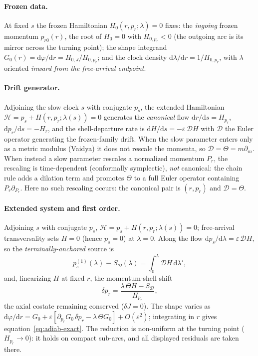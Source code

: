 \documentclass[12pt]{iopart}
\newcommand{\dd}{\mathrm{d}}
\theoremstyle{plain}
\theoremstyle{definition}
\theoremstyle{plain}
\theoremstyle{remark}
\begin{document}
\paragraph{Frozen data.} At fixed $s$ the frozen Hamiltonian $H_0(r,p_r;\lambda)=0$
fixes: the \emph{ingoing} frozen momentum $p_{r0}(r)$, the root of $H_0=0$ with
$H_{0,p_r}<0$ (the outgoing arc is its mirror across the turning point); the shape
integrand $G_0(r)=\dd\varphi/\dd r=H_{0,J}/H_{0,p_r}$; and the clock density
$\dd\lambda/\dd r=1/H_{0,p_r}$, with $\lambda$ oriented \emph{inward from the
free-arrival endpoint}.

\paragraph{Drift generator.} Adjoining the slow clock $s$ with conjugate $p_s$, the
extended Hamiltonian $\mathcal H=p_s+H(r,p_r;\lambda(s))=0$ generates the \emph{canonical}
flow $\dd r/\dd s=H_{p_r}$, $\dd p_r/\dd s=-H_r$, and the shell-departure rate is
$\dd H/\dd s=-\varepsilon\,\mathcal D H$ with $\mathcal D$ the Euler operator generating
the frozen-family drift. When the slow parameter enters only as a metric modulus
(Vaidya) it does not rescale the momenta, so $\mathcal D=\Theta=m\partial_m$. When
instead a slow parameter rescales a normalized momentum $P_r$, the rescaling is
time-dependent (conformally symplectic), \emph{not} canonical: the chain rule adds a
dilation term and promotes $\Theta$ to a full Euler operator containing
$P_r\partial_{P_r}$. Here no such rescaling occurs: the canonical pair is $(r,p_r)$ and
$\mathcal D=\Theta$.

\paragraph{Extended system and first order.} Adjoining $s$ with conjugate $p_s$,
$\mathcal H=p_s+H(r,p_r;\lambda(s))=0$; free-arrival transversality sets $H=0$ (hence
$p_s=0$) at $\lambda=0$. Along the flow $\dd p_s/\dd\lambda=\varepsilon\,\mathcal D H$, so
the \emph{terminally-anchored} source is
\begin{equation}
    p_s^{(1)}(\lambda)\equiv S_{\mathcal D}(\lambda)
    =\int_0^{\lambda}\mathcal D H\,\dd\lambda',
    \label{eq:pS-app}
\end{equation}
and, linearizing $H$ at fixed $r$, the momentum-shell shift
\begin{equation}
    \delta p_r=\frac{\lambda\,\Theta H-S_{\mathcal D}}{H_{p_r}},
    \label{eq:dpr-app}
\end{equation}
the axial costate remaining conserved ($\delta J=0$). The shape varies as
$\dd\varphi/\dd r=G_0+\varepsilon[\partial_{p_r}G_0\,\delta p_r-\lambda\,\Theta G_0]
+O(\varepsilon^2)$; integrating in $r$ gives equation~\eqref{eq:adiab-exact}. The reduction is
non-uniform at the turning point ($H_{p_r}\to0$): it holds on compact sub-arcs, and all
displayed residuals are taken there.
\end{document}
